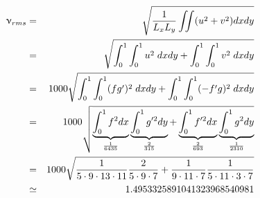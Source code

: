 \begin{eqnarray}
\upnu_{rms}
&=&\sqrt{ \frac{1}{L_xL_y} \iint (u^2+v^2) dxdy   }  \nonumber\\
&=&\sqrt{  \int_0^1\int_0^1 u^2 \; dxdy  +  \int_0^1\int_0^1 v^2 \; dxdy } \nonumber\\
&=&1000\sqrt{  \int_0^1\int_0^1 (fg')^2\; dxdy  +  \int_0^1\int_0^1 (-f'g)^2 \; dxdy } \nonumber\\
&=&1000\sqrt{  
\underbrace{\int_0^1 f^2 dx }_{\frac{1}{6435}}
\underbrace{\int_0^1 g'^2 dy  }_{\frac{2}{315}}
+  
\underbrace{\int_0^1 f'^2 dx}_{\frac{2}{693}} 
\underbrace{\int_0^1 g^2 dy}_{\frac{1}{2310}} 
} \nonumber\\
&=& 1000 \sqrt{ \frac{1}{5\cdot 9 \cdot 13 \cdot 11} \frac{2}{5\cdot 9\cdot 7} + \frac{1}{9\cdot 11 \cdot 7} \frac{1}{5 \cdot 11 \cdot 3 \cdot 7}} \nonumber\\
&\simeq& 1.4953325891041323968540981
\end{eqnarray}


